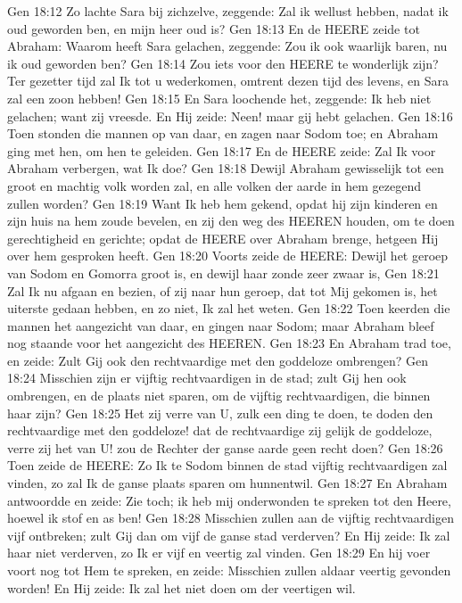 Gen 18:12  Zo lachte Sara bij zichzelve, zeggende: Zal ik wellust hebben, nadat ik oud geworden ben, en mijn heer oud is?
Gen 18:13  En de HEERE zeide tot Abraham: Waarom heeft Sara gelachen, zeggende: Zou ik ook waarlijk baren, nu ik oud geworden ben?
Gen 18:14  Zou iets voor den HEERE te wonderlijk zijn? Ter gezetter tijd zal Ik tot u wederkomen, omtrent dezen tijd des levens, en Sara zal een zoon hebben!
Gen 18:15  En Sara loochende het, zeggende: Ik heb niet gelachen; want zij vreesde. En Hij zeide: Neen! maar gij hebt gelachen.
Gen 18:16  Toen stonden die mannen op van daar, en zagen naar Sodom toe; en Abraham ging met hen, om hen te geleiden.
Gen 18:17  En de HEERE zeide: Zal Ik voor Abraham verbergen, wat Ik doe?
Gen 18:18  Dewijl Abraham gewisselijk tot een groot en machtig volk worden zal, en alle volken der aarde in hem gezegend zullen worden?
Gen 18:19  Want Ik heb hem gekend, opdat hij zijn kinderen en zijn huis na hem zoude bevelen, en zij den weg des HEEREN houden, om te doen gerechtigheid en gerichte; opdat de HEERE over Abraham brenge, hetgeen Hij over hem gesproken heeft.
Gen 18:20  Voorts zeide de HEERE: Dewijl het geroep van Sodom en Gomorra groot is, en dewijl haar zonde zeer zwaar is,
Gen 18:21  Zal Ik nu afgaan en bezien, of zij naar hun geroep, dat tot Mij gekomen is, het uiterste gedaan hebben, en zo niet, Ik zal het weten.
Gen 18:22  Toen keerden die mannen het aangezicht van daar, en gingen naar Sodom; maar Abraham bleef nog staande voor het aangezicht des HEEREN.
Gen 18:23  En Abraham trad toe, en zeide: Zult Gij ook den rechtvaardige met den goddeloze ombrengen?
Gen 18:24  Misschien zijn er vijftig rechtvaardigen in de stad; zult Gij hen ook ombrengen, en de plaats niet sparen, om de vijftig rechtvaardigen, die binnen haar zijn?
Gen 18:25  Het zij verre van U, zulk een ding te doen, te doden den rechtvaardige met den goddeloze! dat de rechtvaardige zij gelijk de goddeloze, verre zij het van U! zou de Rechter der ganse aarde geen recht doen?
Gen 18:26  Toen zeide de HEERE: Zo Ik te Sodom binnen de stad vijftig rechtvaardigen zal vinden, zo zal Ik de ganse plaats sparen om hunnentwil.
Gen 18:27  En Abraham antwoordde en zeide: Zie toch; ik heb mij onderwonden te spreken tot den Heere, hoewel ik stof en as ben!
Gen 18:28  Misschien zullen aan de vijftig rechtvaardigen vijf ontbreken; zult Gij dan om vijf de ganse stad verderven? En Hij zeide: Ik zal haar niet verderven, zo Ik er vijf en veertig zal vinden.
Gen 18:29  En hij voer voort nog tot Hem te spreken, en zeide: Misschien zullen aldaar veertig gevonden worden! En Hij zeide: Ik zal het niet doen om der veertigen wil.
